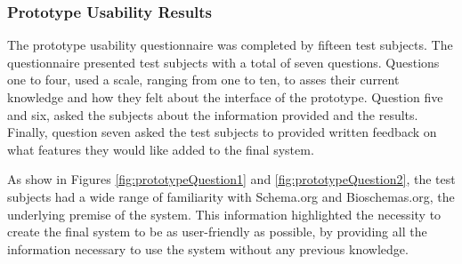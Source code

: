 \subsubsection{Prototype Usability Results}

The prototype usability questionnaire was completed by fifteen test subjects. The questionnaire presented test subjects with a total of seven questions. Questions one to four, used a scale, ranging from one to ten, to asses their current knowledge and how they felt about the interface of the prototype. Question five and six, asked the subjects about the information provided and the results. Finally, question seven asked the test subjects to provided written feedback on what features they would like added to the final system. 


As show in Figures \ref{fig:prototypeQuestion1} and \ref{fig:prototypeQuestion2}, the test subjects had a wide range of familiarity with Schema.org and Bioschemas.org, the underlying premise of the system. This information highlighted the necessity to create the final system to be as user-friendly as possible, by providing all the information necessary to use the system without any previous knowledge. \newline 
